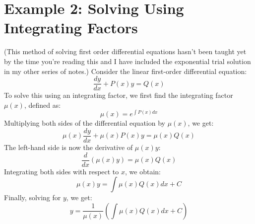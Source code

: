 \documentclass[a4paper,12pt]{article}
\begin{document}
\section{Example 2: Solving Using Integrating Factors}
(This method of solving first order differential equations hasn't been taught yet by the time you're reading this and I have included the exponential trial solution in my other series of notes.)
Consider the linear first-order differential equation:
\begin{equation}
    \frac{dy}{dx} + P(x)y = Q(x)
\end{equation}
To solve this using an integrating factor, we first find the integrating factor \( \mu(x) \), defined as:
\begin{equation}
    \mu(x) = e^{\int P(x) dx}
\end{equation}
Multiplying both sides of the differential equation by \( \mu(x) \), we get:
\begin{equation}
    \mu(x) \frac{dy}{dx} + \mu(x) P(x) y = \mu(x) Q(x)
\end{equation}
The left-hand side is now the derivative of \( \mu(x) y \):
\begin{equation}
    \frac{d}{dx} \left( \mu(x) y \right) = \mu(x) Q(x)
\end{equation}
Integrating both sides with respect to \( x \), we obtain:
\begin{equation}
    \mu(x) y = \int \mu(x) Q(x) dx + C
\end{equation}
Finally, solving for \( y \), we get:
\begin{equation}
    y = \frac{1}{\mu(x)} \left( \int \mu(x) Q(x) dx + C \right)
\end{equation}
\end{document}
